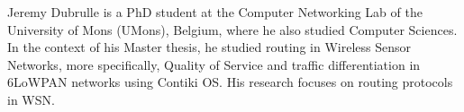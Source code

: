 ​Jeremy Dubrulle is a PhD student at the Computer Networking Lab of the University of Mons (UMons), Belgium, where he also studied Computer Sciences. In the context of his Master thesis, he studied routing in Wireless Sensor Networks, more specifically, Quality of Service and traffic differentiation in 6LoWPAN networks using Contiki OS. His research focuses on routing protocols in WSN.
